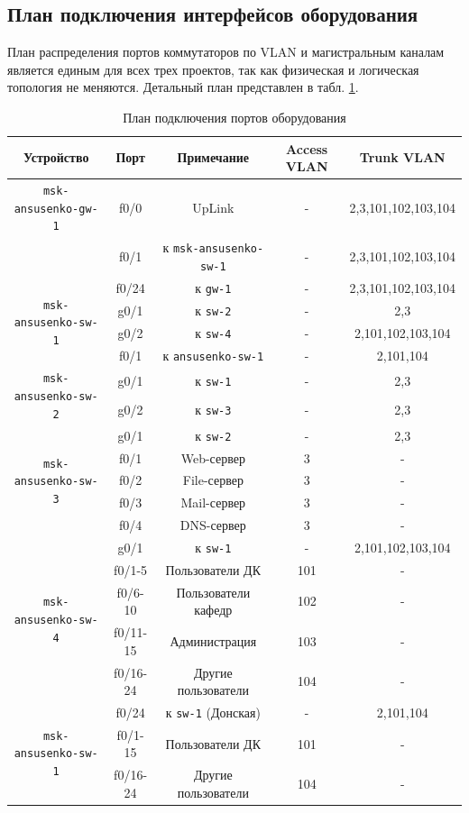 \subsection{План подключения интерфейсов оборудования}
План распределения портов коммутаторов по VLAN и магистральным каналам является единым для всех трех проектов, так как физическая и логическая топология не меняются. Детальный план представлен в табл. \ref{tab:ports}.

\begin{table}[h]
    \centering
    \caption{План подключения портов оборудования}
    \label{tab:ports}
    \begin{tabular}{|c|c|c|c|c|}
        \hline
        \textbf{Устройство} & \textbf{Порт} & \textbf{Примечание} & \textbf{Access VLAN} & \textbf{Trunk VLAN} \\
        \hline
        \texttt{msk-ansusenko-gw-1} & f0/0 & UpLink & - & 2,3,101,102,103,104 \\
        & f0/1 & к \texttt{msk-ansusenko-sw-1} & - & 2,3,101,102,103,104 \\
        \hline
        \multirow{4}{*}{\texttt{msk-ansusenko-sw-1}} & f0/24 & к \texttt{gw-1} & - & 2,3,101,102,103,104 \\
        & g0/1 & к \texttt{sw-2} & - & 2,3 \\
        & g0/2 & к \texttt{sw-4} & - & 2,101,102,103,104 \\
        & f0/1 & к \texttt{ansusenko-sw-1} & - & 2,101,104 \\
        \hline
        \multirow{2}{*}{\texttt{msk-ansusenko-sw-2}} & g0/1 & к \texttt{sw-1} & - & 2,3 \\
        & g0/2 & к \texttt{sw-3} & - & 2,3 \\
        \hline
        \multirow{5}{*}{\texttt{msk-ansusenko-sw-3}} & g0/1 & к \texttt{sw-2} & - & 2,3 \\
        & f0/1 & Web-сервер & 3 & - \\
        & f0/2 & File-сервер & 3 & - \\
        & f0/3 & Mail-сервер & 3 & - \\
        & f0/4 & DNS-сервер & 3 & - \\
        \hline
        \multirow{5}{*}{\texttt{msk-ansusenko-sw-4}} & g0/1 & к \texttt{sw-1} & - & 2,101,102,103,104 \\
        & f0/1-5 & Пользователи ДК & 101 & - \\
        & f0/6-10 & Пользователи кафедр & 102 & - \\
        & f0/11-15 & Администрация & 103 & - \\
        & f0/16-24 & Другие пользователи & 104 & - \\
        \hline
        \multirow{3}{*}{\texttt{msk-ansusenko-sw-1}} & f0/24 & к \texttt{sw-1} (Донская) & - & 2,101,104 \\
        & f0/1-15 & Пользователи ДК & 101 & - \\
        & f0/16-24 & Другие пользователи & 104 & - \\
        \hline
    \end{tabular}
\end{table}

